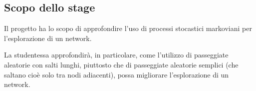 
\subsection{Scopo dello stage}
	Il progetto ha lo scopo di approfondire l’uso di processi stocastici markoviani per l’esplorazione di un network. 
	
	La studentessa approfondirà, in particolare, come l’utilizzo di passeggiate aleatorie con salti lunghi, piuttosto che di passeggiate aleatorie semplici (che saltano cioè solo tra nodi adiacenti), possa migliorare l’esplorazione di un network.
	
	